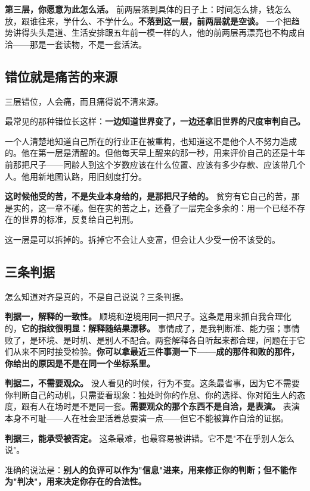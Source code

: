 \documentclass[11pt,a4paper]{ctexart}
\begin{document}
\textbf{第三层，你愿意为此怎么活。} 前两层落到具体的日子上：时间怎么排，钱怎么放，跟谁往来，学什么、不学什么。\textbf{不落到这一层，前两层就是空谈。} 一个把趋势讲得头头是道、生活安排跟五年前一模一样的人，他的前两层再漂亮也不构成自洽——那是一套读物，不是一套活法。

\subsection{错位就是痛苦的来源}

三层错位，人会痛，而且痛得说不清来源。

最常见的那种错位长这样：\textbf{一边知道世界变了，一边还拿旧世界的尺度审判自己。}

一个人清楚地知道自己所在的行业正在被重构，也知道这不是他个人不努力造成的。他在第一层是清醒的。但他每天早上醒来的那一秒，用来评价自己的还是十年前那把尺子——同龄人到这个岁数应该在什么位置、应该有多少存款、应该带几个人。他用新地图认路，用旧刻度打分。

\textbf{这时候他受的苦，不是失业本身给的，是那把尺子给的。} 贫穷有它自己的苦，那是实的，这一章不碰。但在实的苦之上，还叠了一层完全多余的：用一个已经不存在的世界的标准，反复给自己判刑。

这一层是可以拆掉的。拆掉它不会让人变富，但会让人少受一份不该受的。

\subsection{三条判据}

怎么知道对齐是真的，不是自己说说？三条判据。

\textbf{判据一，解释的一致性。} 顺境和逆境用同一把尺子。这条是用来抓自我合理化的，\textbf{它的指纹很明显：解释随结果漂移。} 事情成了，是我判断准、能力强；事情败了，是环境、是时机、是别人不配合。两套解释各自听起来都合理，问题在于它们从来不同时接受检验。\textbf{你可以拿最近三件事测一下——成的那件和败的那件，你给出的原因是不是在同一个坐标系里。}

\textbf{判据二，不需要观众。} 没人看见的时候，行为不变。这条最省事，因为它不需要你判断自己的动机，只需要看现象：独处时你的作息、你的选择、你对陌生人的态度，跟有人在场时是不是同一套。\textbf{需要观众的那个东西不是自洽，是表演。} 表演本身不可耻——人在社会里活着总要演一点——但它不能被算作自洽的证据。

\textbf{判据三，能承受被否定。} 这条最难，也最容易被讲错。它不是"不在乎别人怎么说"。

准确的说法是：\textbf{别人的负评可以作为"信息"进来，用来修正你的判断；但不能作为"判决"，用来决定你存在的合法性。}
\end{document}
